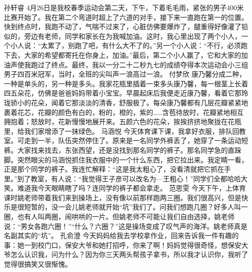 {}\markdownRendererInterblockSeparator
{}孙轩睿\markdownRendererInterblockSeparator
{}4月26日是我校春季运动会第二天，下午，下着毛毛雨，紧张的男子400米比赛开始了。我在第二个弯道时超上了六道的对手，接下来一直跑在第一的位置。快到终点时，我跑不动了，气喘不过来了，心脏仿佛要爆炸了，腿重得好像灌了铅似的，旁边有老师，同学和家长在为我喊加油。这时，我心里出现了两个小人，一个小人说：“太累了，别跑了吧，有什么大不了的。”另一个小人说：“不行，必须跑下去，大家的希望都寄托在你身上，加油。”最后，第二个小人赢了，它和大家的加油声使我跑过了终点。最终，我以一分二十二秒九七的成绩夺得本次运动会小三组男子四百米冠军，当时，全班的尖叫声一浪高过一浪。\markdownRendererInterblockSeparator
{}\markdownRendererInterblockSeparator
{}付梦欣\markdownRendererInterblockSeparator
{}康乃馨分成二种，一种是单头的，另一种是多头。我家花瓶里插着一束多头康乃馨，每一根茎上长着四五朵花，仿佛是爸爸妈妈带着小宝宝。早晨起床后我便走近康乃馨，看着它那玲珑骄小的花朵，闻着它那淡淡的清香，舒服极了。每朵康乃馨都有几层花瓣紧紧地裹着花芯，花瓣的颜色有白的，粉的，橙的，紫的……含苞待放时，花瓣紧地相互拥抱着；怒放时，花新慢慢地展开来。五颜六色的花朵，挨挨挤挤地聚拢在花瓶里，给我们家增添了一抹绿色。\markdownRendererInterblockSeparator
{}\markdownRendererInterblockSeparator
{}马涵悦\markdownRendererInterblockSeparator
{}今天体育课下课，我拿好衣服，排队回教室。可走到一半，队伍突然停住了。原来是一名同学外裤丢了，她穿了一条运动短裤。大家找来找去，东张西望，还是没找到那名同学的裤子。那名同学急的直跺脚。突然眼尖的马涵悦抓住我衣服中的一个什么东西，把它拉出来。我定睛一看，正是那个同学的裤子。我连忙解释：“这是我太粗心了，没看清就把它抓在手里。”到了教室，有人说：“我觉得王子彦可以改名为—王粗心！”同学们全都哈哈大笑。难道我今天眼睛瞎了吗？连同学的裤子都会拿走。\markdownRendererInterblockSeparator
{}\markdownRendererInterblockSeparator
{}范思雯\markdownRendererInterblockSeparator
{}今天下午，上体育课时姚老师带着我们来到操场上，没有像以前那样跑两三圈。我们很高兴，但是快乐是很短暂的，没一会儿姚老师就开始“坑”我们了。问我们想跑几圈？好多人叫一圈，也有人叫两圈，闹哄哄的一片。但姚老师不可能让我们自由选择，姚老师说：“男女各跑六圈！”“什么？六圈？”这是操场变成了叹气声的海洋。姚老师真是名副其实的“坑”。\markdownRendererInterblockSeparator
{}\markdownRendererInterblockSeparator
{}孔俞澄\markdownRendererInterblockSeparator
{}今天妈妈给我去学校拿作业，回来告诉我一件有趣的事：她一到校门口，保安大爷和她打招呼，你来了啊！妈妈觉得很奇怪，想保安大爷怎么认识我，问为什么？因为你三天两头帮孩子拿书，所以我才认识你，我听了觉得很搞笑又很惭愧。\markdownRendererInterblockSeparator
